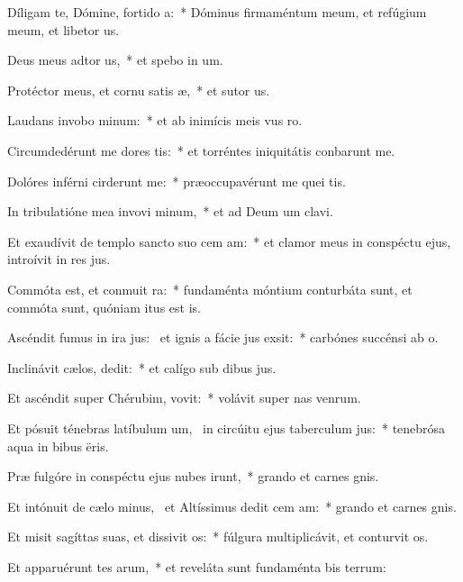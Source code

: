 \item Díligam te, Dómine, fortido a:~* Dóminus firmaméntum meum, et refúgium meum, et libetor us.
\item Deus meus adtor us,~* et spebo in um.
\item Protéctor meus, et cornu satis æ,~* et sutor us.
\item Laudans invobo minum:~* et ab inimícis meis vus ro.
\item Circumdedérunt me dores tis:~* et torréntes iniquitátis conbarunt me.
\item Dolóres inférni cirderunt me:~* præoccupavérunt me quei tis.
\item In tribulatióne mea invovi minum,~* et ad Deum um clavi.
\item Et exaudívit de templo sancto suo cem am:~* et clamor meus in conspéctu ejus, introívit in res jus.
\item Commóta est, et conmuit ra:~* fundaménta móntium conturbáta sunt, et commóta sunt, quóniam itus est is.
\item Ascéndit fumus in ira jus:~\pscross{} et ignis a fácie jus exsit:~* carbónes succénsi  ab o.
\item Inclinávit cælos,  dedit:~* et calígo sub dibus jus.
\item Et ascéndit super Chérubim,  vovit:~* volávit super nas venrum.
\item Et pósuit ténebras latíbulum um,~\pscross{} in circúitu ejus taberculum jus:~* tenebrósa aqua in bibus ëris.
\item Præ fulgóre in conspéctu ejus nubes irunt,~* grando et carnes gnis.
\item Et intónuit de cælo minus,~\pscross{} et Altíssimus dedit cem am:~* grando et carnes gnis.
\item Et misit sagíttas suas, et dissivit os:~* fúlgura multiplicávit, et conturvit os.
\item Et apparuérunt tes arum,~* et reveláta sunt fundaménta bis terrum:
